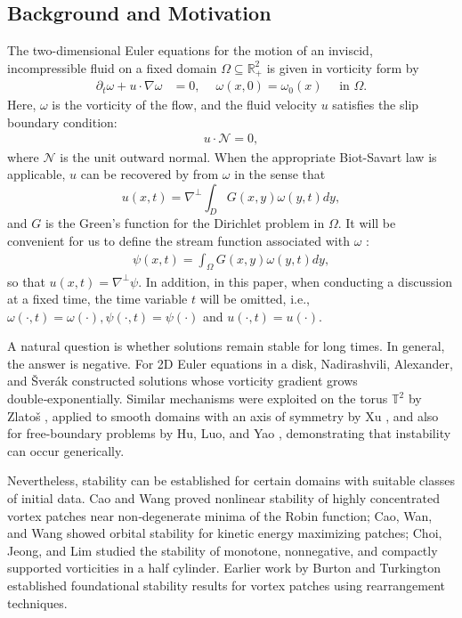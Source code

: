 \documentclass[11pt,letterpaper]{amsart}
\theoremstyle{definition}
\theoremstyle{remark}
\newcommand{\R}{\mathbb{R}}
\newcommand{\p}{\partial}
\renewcommand{\tt}[1]{\text{#1}}
\numberwithin{equation}{section}
\begin{document}
\subsection{Background and Motivation}

The two-dimensional Euler equations for the motion of an inviscid, incompressible fluid on a fixed domain $\Omega\subseteq \R^2_+$ is given in vorticity form by
\begin{align}
    \p_t \omega +u\cdot\nabla \omega&= 0, ~ \quad \omega(x,0)=\omega_0(x) \quad \tt{ in } \Omega.  \label{eqn:vorticity equation}
\end{align}
Here, $\omega$ is the vorticity of the flow, and the fluid velocity $u$ satisfies the slip boundary condition: 
\begin{align*}
    u\cdot \mathcal{N}=0,
\end{align*}
where \(\mathcal{N}\) is the unit outward normal. When the appropriate Biot-Savart law is applicable, $u$ can be recovered by from $\omega$ in the sense that $$u(x,t)=\nabla^\perp \int_D G(x,y)\omega(y,t)dy,$$ and $G$ is the Green's function for the Dirichlet problem in $\Omega$. It will be convenient for us to define the stream function associated with $\omega$ :
\begin{align}
    \psi(x,t)=\int_{\Omega} G(x,y) \omega(y,t)dy, \label{def:stream function}
\end{align}
so that $u(x,t)=\nabla^\perp \psi$. In addition, in this paper, when conducting a discussion at a fixed time, the time variable $t$ will be omitted, i.e., $\omega (\cdot, t) = \omega (\cdot), \psi (\cdot, t) = \psi (\cdot) $ and $u(\cdot, t) = u(\cdot) $.

A natural question is whether solutions remain stable for long times. In general, the answer is negative. For 2D Euler equations in a disk, Nadirashvili, Alexander, and Šverák \cite{kiselev2014small} constructed solutions whose vorticity gradient grows double‑exponentially. Similar mechanisms were exploited on the torus $\mathbb{T}^2$ by Zlato{\v{s}} \cite{zlatovs2015exponential}, applied to smooth domains with an axis of symmetry by Xu \cite{xu2016fast}, and also for free-boundary problems by Hu, Luo, and Yao \cite{hu2024small}, demonstrating that instability can occur generically.

Nevertheless, stability can be established for certain domains with suitable classes of initial data. Cao and Wang \cite{cao2021nonlinear} proved nonlinear stability of highly concentrated vortex patches near non‑degenerate minima of the Robin function; Cao, Wan, and Wang \cite{cao2019nonlinear} showed orbital stability for kinetic energy maximizing patches; Choi, Jeong, and Lim \cite{choi2022stability} studied the stability of monotone, nonnegative, and compactly supported vorticities in a half cylinder. Earlier work by Burton \cite{burton2005global} and Turkington \cite{turkington1987evolution} established foundational stability results for vortex patches using rearrangement techniques. 
\end{document}
